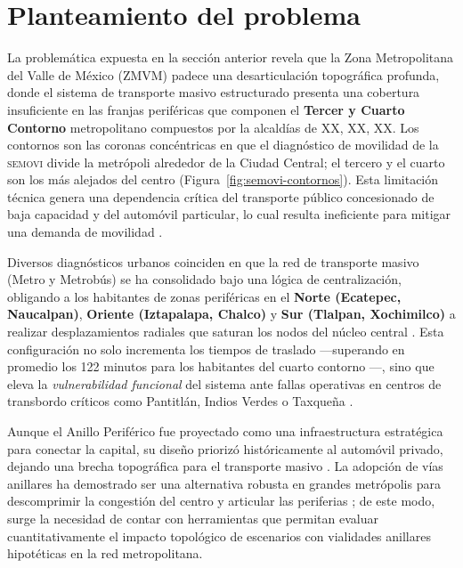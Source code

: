 
\section{Planteamiento del problema}
\label{sec:planteamiento}

La problemática expuesta en la sección anterior revela que la Zona Metropolitana del
Valle de México (ZMVM) padece una desarticulación topográfica profunda, donde el
sistema de transporte masivo estructurado presenta una cobertura insuficiente en
las franjas periféricas que componen el \textbf{Tercer y Cuarto Contorno}
metropolitano \citep{semovi2020diagnostico} compuestos por la alcaldías de XX, XX, XX. Los contornos son las coronas
concéntricas en que el diagnóstico de movilidad de la \textsc{semovi} divide la
metrópoli alrededor de la Ciudad Central; el tercero y el cuarto son los más
alejados del centro (Figura~\ref{fig:semovi-contornos}). Esta limitación técnica genera una
dependencia crítica del transporte público concesionado de baja capacidad y del
automóvil particular, lo cual resulta ineficiente para mitigar una demanda de
movilidad .

Diversos diagnósticos urbanos coinciden en que la red de transporte masivo (Metro y Metrobús)
se ha consolidado bajo una lógica de centralización, obligando a los habitantes
de zonas periféricas en el \textbf{Norte (Ecatepec, Naucalpan)},
\textbf{Oriente (Iztapalapa, Chalco)} y \textbf{Sur (Tlalpan, Xochimilco)} a
realizar desplazamientos radiales que saturan los nodos del núcleo central
\citep{obras2025}. Esta configuración no solo incrementa los tiempos de traslado
---superando en promedio los 122 minutos para los habitantes del cuarto
contorno \citep{semovi2020diagnostico}---, sino que eleva la \textit{vulnerabilidad funcional} del sistema
ante fallas operativas en centros de transbordo críticos como Pantitlán, Indios Verdes o Taxqueña
\citep{lotero2014vulnerabilidad}.

Aunque el Anillo Periférico fue proyectado como una infraestructura estratégica
para conectar la capital, su diseño priorizó históricamente 
al automóvil privado, dejando una brecha topográfica para el transporte masivo .
La adopción de vías anillares ha demostrado ser una alternativa robusta en
grandes metrópolis para descomprimir la congestión del centro y articular las periferias
\citep{efe2023}; de este modo, surge la necesidad de contar con herramientas que
permitan evaluar cuantitativamente el impacto topológico de escenarios con vialidades anillares
hipotéticas en la red metropolitana.

